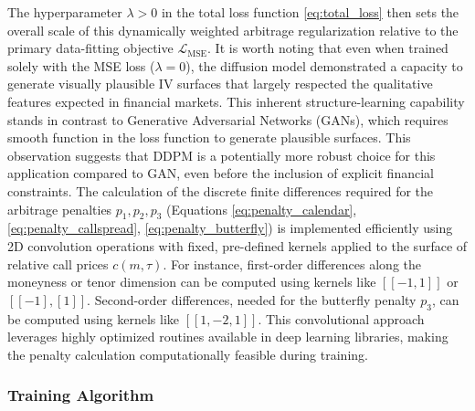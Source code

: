 \documentclass{article}
\begin{document}
The hyperparameter $\lambda > 0$ in the total loss function \eqref{eq:total_loss} then sets the overall scale of this dynamically weighted arbitrage regularization relative to the primary data-fitting objective $\mathcal{L}_{\text{MSE}}$. It is worth noting that even when trained solely with the MSE loss ($\lambda=0$), the diffusion model demonstrated a capacity to generate visually plausible IV surfaces that largely respected the qualitative features expected in financial markets. This inherent structure-learning capability stands in contrast to Generative Adversarial Networks (GANs), which requires smooth function in the loss function to generate plausible surfaces. This observation suggests that DDPM is a potentially more robust choice for this application compared to GAN, even before the inclusion of explicit financial constraints. The calculation of the discrete finite differences required for the arbitrage penalties $p_1, p_2, p_3$ (Equations \eqref{eq:penalty_calendar}, \eqref{eq:penalty_callspread}, \eqref{eq:penalty_butterfly}) is implemented efficiently using 2D convolution operations with fixed, pre-defined kernels applied to the surface of relative call prices $c(m, \tau)$. For instance, first-order differences along the moneyness or tenor dimension can be computed using kernels like $[[-1, 1]]$ or $[[-1], [1]]$. Second-order differences, needed for the butterfly penalty $p_3$, can be computed using kernels like $[[1, -2, 1]]$. This convolutional approach leverages highly optimized routines available in deep learning libraries, making the penalty calculation computationally feasible during training.

\subsubsection{Training Algorithm}
\end{document}
